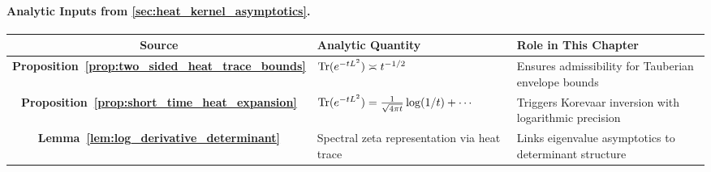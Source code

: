 \paragraph{Analytic Inputs from \cref{sec:heat_kernel_asymptotics}.}

\begin{center}
\renewcommand{\arraystretch}{1.3}
\begin{tabularx}{\textwidth}{|c|X|X|}
\hline
\textbf{Source} & \textbf{Analytic Quantity} & \textbf{Role in This Chapter} \\
\hline
\textbf{Proposition~\ref{prop:two_sided_heat_trace_bounds}} &
\( \operatorname{Tr}(e^{-tL^2}) \asymp t^{-1/2} \) &
Ensures admissibility for Tauberian envelope bounds \\

\textbf{Proposition~\ref{prop:short_time_heat_expansion}} &
\( \operatorname{Tr}(e^{-tL^2}) = \frac{1}{\sqrt{4\pi t}} \log(1/t) + \cdots \) &
Triggers Korevaar inversion with logarithmic precision \\

\textbf{Lemma~\ref{lem:log_derivative_determinant}} &
Spectral zeta representation via heat trace &
Links eigenvalue asymptotics to determinant structure \\
\hline
\end{tabularx}
\end{center}
